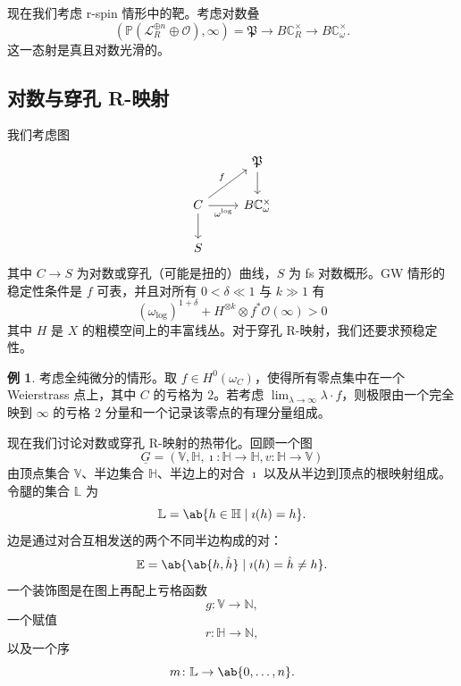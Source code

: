 \documentclass{amsart}
\theoremstyle{definition}
\newtheorem{exm}[thm]{例}
\theoremstyle{remark}
\theoremstyle{plain}
\theoremstyle{definition}
\theoremstyle{remark}
\newcommand{\N}{\mathbb{N}}
\newcommand{\C}{\mathbb{C}}
\newcommand{\E}{\mathbb{E}}
\newcommand{\V}{\mathbb{V}}
\renewcommand{\H}{\mathbb{H}}
\renewcommand{\L}{\mathbb{L}}
\renewcommand{\P}{\mathbb{P}}
\newcommand{\mc}[1]{\mathcal{#1}}
\newcommand{\mf}[1]{\mathfrak{#1}}
\newcommand{\ul}[1]{\underline{#1}}
\newcommand{\1}{\mathbf{1}}
\newcommand{\2}{\mathbf{2}}
\newcommand{\3}{\mathbf{3}}
\begin{document}
现在我们考虑 r-spin 情形中的靶。考虑对数叠
\[ (\P(\mc{L}_R^{\oplus n} \oplus \mc{O}), \infty) = \mf{P} \to B \C_R^{\times} \to B \C_{\omega}^{\times}. \]
这一态射是真且对数光滑的。

\subsection{对数与穿孔 R-映射}%
\label{sub:Log and punctured R-maps}

我们考虑图
\begin{equation*}
\begin{tikzcd}
    & \mf{P} \ar{d} \\
    C \ar{ur}{f} \ar{r}[swap]{\omega^{\log}} \ar{d} & B \C_{\omega}^{\times} \\
    S
\end{tikzcd}
\end{equation*}
其中 \(C \to S\) 为对数或穿孔（可能是扭的）曲线，\(S\) 为 fs 对数概形。GW 情形的稳定性条件是 \(f\) 可表，并且对所有 \(0 < \delta \ll 1\) 与 \(k \gg 1\) 有
\[ (\omega_{\log})^{1+\delta} + H^{\otimes k} \otimes f^* \mc{O}(\infty) > 0 \]
其中 \(H\) 是 \(X\) 的粗模空间上的丰富线丛。对于穿孔 R-映射，我们还要求预稳定性。

\begin{exm}
    考虑全纯微分的情形。取 \(f \in H^0(\omega_C)\)，使得所有零点集中在一个 Weierstrass 点上，其中 \(C\) 的亏格为 \(2\)。若考虑 \(\lim_{\lambda \to \infty} \lambda \cdot f\)，则极限由一个完全映到 \(\infty\) 的亏格 \(2\) 分量和一个记录该零点的有理分量组成。
\end{exm}

现在我们讨论对数或穿孔 R-映射的热带化。回顾一个图
\[ \ul{G} = (\V, \H, \imath \colon \H \to \H, v \colon \H \to \V) \]
由顶点集合 \(\V\)、半边集合 \(\H\)、半边上的对合 \(\imath\) 以及从半边到顶点的根映射组成。令腿的集合 \(\L\) 为
\[ \L = \ab\{ h \in \H \mid \imath(h) = h\}. \]
边是通过对合互相发送的两个不同半边构成的对：
\[ \E = \ab\{ \ab\{h, \hat{h}\} \mid \imath(h) = \hat{h} \neq h \}. \]
一个装饰图是在图上再配上亏格函数
\[ g \colon \V \to \N, \]
一个赋值
\[ r \colon \H \to \N, \]
以及一个序
\[ m \colon \L \to \ab\{0, \ldots, n\}. \]
\end{document}
